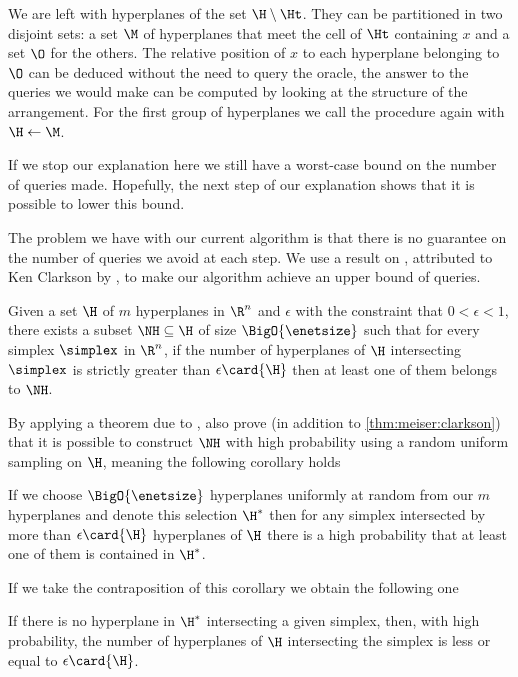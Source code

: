 We are left with hyperplanes of the set $\H \setminus \Ht$. They can be
partitioned in two disjoint sets: a set $\M$ of hyperplanes that meet the cell of
$\Ht$ containing $x$ and a set $\O$ for the others. The relative position of $x$
to each hyperplane belonging to $\O$ can be deduced without the need to query
the oracle, the answer to the queries we would make can be computed by looking
at the structure of the arrangement. For the first group of hyperplanes
we call the procedure again with $\H \gets \M$.

If we stop our explanation here we still have a worst-case 
bound on the number of queries made. Hopefully, the next step of our
explanation shows that it is possible to lower this bound.

The problem we have with our current algorithm is that there is no guarantee
on the number of queries we avoid at each step.
We use a result on \enets, attributed to Ken Clarkson by
\citet{burgisser:1997}, to make our algorithm achieve an upper bound
of  queries.
\begin{theorem}[Clarkson]\label{thm:meiser:clarkson}
Given a set $\H$ of $m$ hyperplanes in $\R^n$ and $\epsilon$ with the
constraint that $0 < \epsilon < 1$, there exists a subset $\NH \subseteq \H$ of
size $\BigO{\enetsize}$ such that for every simplex $\simplex$ in $\R^n$, if the
number of hyperplanes of $\H$ intersecting $\simplex$ is strictly greater than
$\epsilon \card{\H}$ then at least one of them belongs to $\NH$.
\end{theorem}

By applying a theorem due to \citet*{haussler:1987},
\citet{burgisser:1997} also prove (in addition to \ref{thm:meiser:clarkson}) that it is possible to
construct $\NH$ with high probability using a random uniform sampling on $\H$,
meaning the following corollary holds
\begin{corollary}
If we choose $\BigO{\enetsize}$ hyperplanes uniformly at
random from our $m$ hyperplanes and denote this selection $\H^{*}$ then for
any simplex intersected by more than $\epsilon \card{\H}$ hyperplanes of $\H$
there is a high probability that at least one of them is contained in $\H^{*}$.
\end{corollary}

If we take the contraposition of this corollary we obtain the following one
\begin{corollary}
If there is no hyperplane in $\H^{*}$ intersecting a given simplex, then, with
high probability, the number of hyperplanes of $\H$ intersecting the simplex
is less or equal to $\epsilon \card{\H}$.
\end{corollary}

